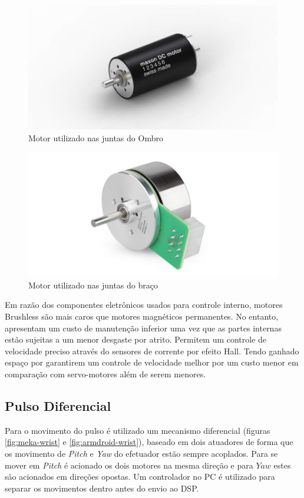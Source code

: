 \begin{figure}[H]
    \centering
    \includegraphics[width = 0.5\linewidth]{figs/maxon_servo.jpg}
    \caption{Motor utilizado nas juntas do Ombro}
    \label{fig:maxon-servo}
\end{figure}

\begin{figure}[H]
    \centering
    \includegraphics[width = 0.5\linewidth]{figs/maxon_flat_servo.jpg}
    \caption{Motor utilizado nas juntas do braço}
    \label{fig:maxon-flat-servo}
\end{figure}

Em razão dos componentes eletrônicos usados para controle interno, motores Brushless são mais caros que motores magnéticos permanentes. No entanto, apresentam um custo de manutenção inferior uma vez que as partes internas estão sujeitas a um menor desgaste por atrito. Permitem um controle de velocidade preciso através do sensores de corrente por efeito Hall. Tendo ganhado espaço por garantirem um controle de velocidade melhor por um custo menor em comparação com servo-motores além de serem menores.


\subsection{Pulso Diferencial}

Para o movimento do pulso é utilizado um mecanismo diferencial (figuras \ref{fig:meka-wrist} e \ref{fig:armdroid-wrist}), baseado em dois atuadores de forma que os movimento de \textit{Pitch} e \textit{Yaw} do efetuador estão sempre acoplados. Para se mover em \textit{Pitch} é acionado os dois motores na mesma direção e para $Yaw$ estes são acionados em direções opostas. Um controlador no PC é utilizado para separar os movimentos dentro antes do envio ao DSP.

